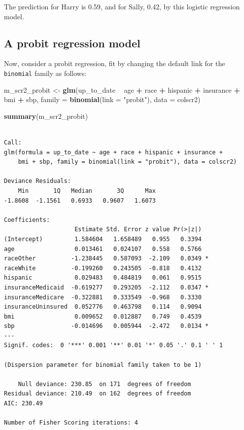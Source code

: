 \documentclass[]{book}
\newenvironment{Shaded}{\begin{snugshade}}{\end{snugshade}}
\newcommand{\KeywordTok}[1]{\textcolor[rgb]{0.13,0.29,0.53}{\textbf{#1}}}
\newcommand{\DataTypeTok}[1]{\textcolor[rgb]{0.13,0.29,0.53}{#1}}
\newcommand{\StringTok}[1]{\textcolor[rgb]{0.31,0.60,0.02}{#1}}
\newcommand{\OperatorTok}[1]{\textcolor[rgb]{0.81,0.36,0.00}{\textbf{#1}}}
\newcommand{\NormalTok}[1]{#1}
\theoremstyle{definition}
\theoremstyle{definition}
\theoremstyle{definition}
\theoremstyle{remark}
\begin{document}
The prediction for Harry is 0.59, and for Sally, 0.42, by this logistic
regression model.

\subsection{A probit regression model}\label{a-probit-regression-model}

Now, consider a probit regression, fit by changing the default link for
the \texttt{binomial} family as follows:

\begin{Shaded}
\begin{Highlighting}[]
\NormalTok{m_scr2_probit <-}\StringTok{ }\KeywordTok{glm}\NormalTok{(up_to_date }\OperatorTok{~}\StringTok{ }\NormalTok{age }\OperatorTok{+}\StringTok{ }\NormalTok{race }\OperatorTok{+}\StringTok{ }\NormalTok{hispanic }\OperatorTok{+}\StringTok{ }
\StringTok{                    }\NormalTok{insurance }\OperatorTok{+}\StringTok{ }\NormalTok{bmi }\OperatorTok{+}\StringTok{ }\NormalTok{sbp, }
                \DataTypeTok{family =} \KeywordTok{binomial}\NormalTok{(}\DataTypeTok{link =} \StringTok{"probit"}\NormalTok{), }
                \DataTypeTok{data =}\NormalTok{ colscr2)}

\KeywordTok{summary}\NormalTok{(m_scr2_probit)}
\end{Highlighting}
\end{Shaded}

\begin{verbatim}

Call:
glm(formula = up_to_date ~ age + race + hispanic + insurance + 
    bmi + sbp, family = binomial(link = "probit"), data = colscr2)

Deviance Residuals: 
    Min       1Q   Median       3Q      Max  
-1.8608  -1.1561   0.6933   0.9607   1.6073  

Coefficients:
                    Estimate Std. Error z value Pr(>|z|)  
(Intercept)         1.584604   1.658489   0.955   0.3394  
age                 0.013461   0.024107   0.558   0.5766  
raceOther          -1.238445   0.587093  -2.109   0.0349 *
raceWhite          -0.199260   0.243505  -0.818   0.4132  
hispanic            0.029483   0.484819   0.061   0.9515  
insuranceMedicaid  -0.619277   0.293205  -2.112   0.0347 *
insuranceMedicare  -0.322881   0.333549  -0.968   0.3330  
insuranceUninsured  0.052776   0.463798   0.114   0.9094  
bmi                 0.009652   0.012887   0.749   0.4539  
sbp                -0.014696   0.005944  -2.472   0.0134 *
---
Signif. codes:  0 '***' 0.001 '**' 0.01 '*' 0.05 '.' 0.1 ' ' 1

(Dispersion parameter for binomial family taken to be 1)

    Null deviance: 230.85  on 171  degrees of freedom
Residual deviance: 210.49  on 162  degrees of freedom
AIC: 230.49

Number of Fisher Scoring iterations: 4
\end{verbatim}
\end{document}
